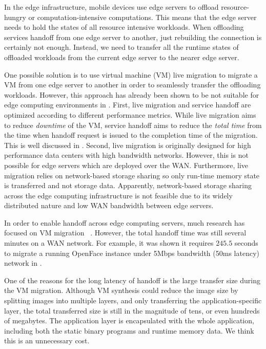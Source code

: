 %
In the edge infrastructure, mobile devices use edge servers to offload resource-hungry or computation-intensive computations. This means that the edge server needs to hold the states of all resource intensive workloads. 
When offloading services handoff from one edge server to another, just rebuilding the connection is certainly not enough. Instead, we need to transfer all the runtime states of offloaded workloads from the current edge server to the nearer edge server.  

One possible solution is 
to use virtual machine (VM) live migration\cite{vmlivemig} 
to migrate a VM from one edge server to another in order to seamlessly transfer the offloading workloads. However, this approach has already been shown to be not suitable for edge computing environments in  \cite{ha2015vmhandoff}. 
First, live migration and service handoff are optimized according to different performance metrics. While live migration aims to reduce \textit{downtime} of the VM, service handoff aims to reduce the \textit{total time} from the time when handoff request is issued to the completion time of the migration. This is well discussed in \cite{ha2015vmhandoff}.
Second, live migration is originally designed for high performance data centers with high bandwidth networks. However, this is not possible for edge servers which are deployed over the WAN. Furthermore, live migration relies on network-based storage sharing so only run-time memory state is transferred and not storage data. Apparently, network-based storage sharing across the edge computing infrastructure is not feasible due to its widely distributed nature and low WAN bandwidth between edge servers. 

In order to enable handoff across edge computing servers, much research has focused on VM migration ~\cite{satya2009case,ha2015vmhandoff}. 
However, the total handoff time was still several minutes on a WAN network. For example, it was shown it requires $245.5$ seconds to migrate a running OpenFace instance under 5Mbps bandwidth (50ms latency) network in \cite{ha2015vmhandoff}. 

One of the reasons for the long latency of handoff is the large transfer size during the VM migration. Although VM synthesis could reduce the image size by splitting images into multiple layers, and only transferring the application-specific layer, the total transferred size is still in the magnitude of tens, or even hundreds of megabytes. 
The application layer is encapsulated with the whole application, including both the static binary programs and runtime memory data. We think this is an unnecessary cost. 


